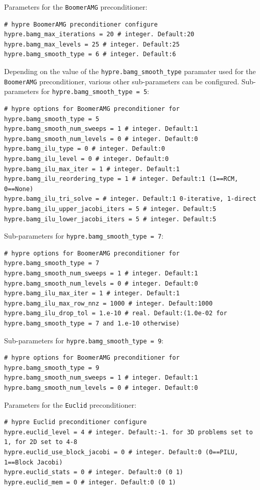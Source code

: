 \documentclass[11pt]{article}
\begin{document}
\begin{itemize}
Parameters for the \verb|BoomerAMG| preconditioner:
\begin{lstlisting}[language=pkgconfig]
# hypre BoomerAMG preconditioner configure
hypre.bamg_max_iterations = 20 # integer. Default:20
hypre.bamg_max_levels = 25 # integer. Default:25
hypre.bamg_smooth_type = 6 # integer. Default:6
\end{lstlisting}

Depending on the value of the \verb|hypre.bamg_smooth_type| paramater used for the \verb|BoomerAMG| preconditioner, various other sub-parameters can be configured.
Sub-parameters for \verb|hypre.bamg_smooth_type = 5|:
\begin{lstlisting}[language=pkgconfig]
# hypre options for BoomerAMG preconditioner for hypre.bamg_smooth_type = 5
hypre.bamg_smooth_num_sweeps = 1 # integer. Default:1
hypre.bamg_smooth_num_levels = 0 # integer. Default:0
hypre.bamg_ilu_type = 0 # integer. Default:0
hypre.bamg_ilu_level = 0 # integer. Default:0
hypre.bamg_ilu_max_iter = 1 # integer. Default:1
hypre.bamg_ilu_reordering_type = 1 # integer. Default:1 (1==RCM, 0==None)
hypre.bamg_ilu_tri_solve = # integer. Default:1 0-iterative, 1-direct
hypre.bamg_ilu_upper_jacobi_iters = 5 # integer. Default:5
hypre.bamg_ilu_lower_jacobi_iters = 5 # integer. Default:5
\end{lstlisting}

Sub-parameters for \verb|hypre.bamg_smooth_type = 7|:
\begin{lstlisting}[language=pkgconfig]
# hypre options for BoomerAMG preconditioner for hypre.bamg_smooth_type = 7
hypre.bamg_smooth_num_sweeps = 1 # integer. Default:1
hypre.bamg_smooth_num_levels = 0 # integer. Default:0
hypre.bamg_ilu_max_iter = 1 # integer. Default:1
hypre.bamg_ilu_max_row_nnz = 1000 # integer. Default:1000
hypre.bamg_ilu_drop_tol = 1.e-10 # real. Default:(1.0e-02 for hypre.bamg_smooth_type = 7 and 1.e-10 otherwise)
\end{lstlisting}

Sub-parameters for \verb|hypre.bamg_smooth_type = 9|:
\begin{lstlisting}[language=pkgconfig]
# hypre options for BoomerAMG preconditioner for hypre.bamg_smooth_type = 9
hypre.bamg_smooth_num_sweeps = 1 # integer. Default:1
hypre.bamg_smooth_num_levels = 0 # integer. Default:0
\end{lstlisting}

Parameters for the \verb|Euclid| preconditioner:
\begin{lstlisting}[language=pkgconfig]
# hypre Euclid preconditioner configure
hypre.euclid_level = 4 # integer. Default:-1. for 3D problems set to 1, for 2D set to 4-8
hypre.euclid_use_block_jacobi = 0 # integer. Default:0 (0==PILU, 1==Block Jacobi)
hypre.euclid_stats = 0 # integer. Default:0 (0 1)
hypre.euclid_mem = 0 # integer. Default:0 (0 1)
\end{lstlisting}


\end{itemize}
\end{document}
